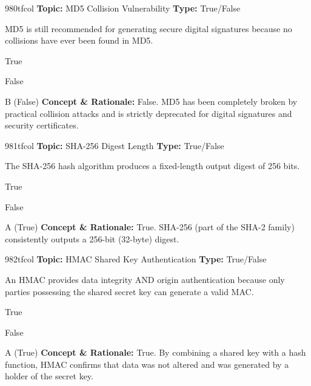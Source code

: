 \begin{qcard}{980}{tfcol}
\textcolor{darkslate!75}{\small\textbf{Topic:} MD5 Collision Vulnerability \hfill \textbf{Type:} True/False}\vspace{0.4em}\par
MD5 is still recommended for generating secure digital signatures because no collisions have ever been found in MD5.
\begin{qoptions}
\item True
\item False
\end{qoptions}
\end{qcard}
\nopagebreak
\begin{explainbox}{B (False)}
\textbf{Concept \& Rationale:} False. MD5 has been completely broken by practical collision attacks and is strictly deprecated for digital signatures and security certificates.
\end{explainbox}

\begin{qcard}{981}{tfcol}
\textcolor{darkslate!75}{\small\textbf{Topic:} SHA-256 Digest Length \hfill \textbf{Type:} True/False}\vspace{0.4em}\par
The SHA-256 hash algorithm produces a fixed-length output digest of 256 bits.
\begin{qoptions}
\item True
\item False
\end{qoptions}
\end{qcard}
\nopagebreak
\begin{explainbox}{A (True)}
\textbf{Concept \& Rationale:} True. SHA-256 (part of the SHA-2 family) consistently outputs a 256-bit (32-byte) digest.
\end{explainbox}

\begin{qcard}{982}{tfcol}
\textcolor{darkslate!75}{\small\textbf{Topic:} HMAC Shared Key Authentication \hfill \textbf{Type:} True/False}\vspace{0.4em}\par
An HMAC provides data integrity AND origin authentication because only parties possessing the shared secret key can generate a valid MAC.
\begin{qoptions}
\item True
\item False
\end{qoptions}
\end{qcard}
\nopagebreak
\begin{explainbox}{A (True)}
\textbf{Concept \& Rationale:} True. By combining a shared key with a hash function, HMAC confirms that data was not altered and was generated by a holder of the secret key.
\end{explainbox}

